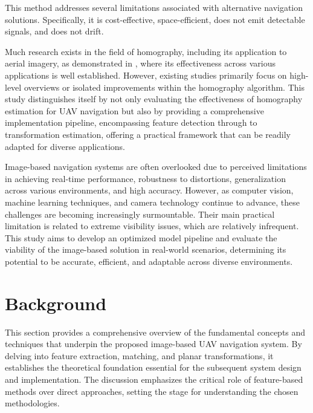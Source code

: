 This method addresses several limitations associated with alternative navigation solutions. Specifically, it is cost-effective, space-efficient, does not emit detectable signals, and does not drift. 

Much research exists in the field of homography, including its application to aerial imagery, as demonstrated in \cite{Zhang2024}, where its effectiveness across various applications is well established. However, existing studies primarily focus on high-level overviews or isolated improvements within the homography algorithm. This study distinguishes itself by not only evaluating the effectiveness of homography estimation for UAV navigation but also by providing a comprehensive implementation pipeline, encompassing feature detection through to transformation estimation, offering a practical framework that can be readily adapted for diverse applications.

Image-based navigation systems are often overlooked due to perceived limitations in achieving real-time performance, robustness to distortions, generalization across various environments, and high accuracy. However, as computer vision, machine learning techniques, and camera technology continue to advance, these challenges are becoming increasingly surmountable. Their main practical limitation is related to extreme visibility issues, which are relatively infrequent. This study aims to develop an optimized model pipeline and evaluate the viability of the image-based solution in real-world scenarios, determining its potential to be accurate, efficient, and adaptable across diverse environments.


\section{Background}

This section provides a comprehensive overview of the fundamental concepts and techniques that underpin the proposed image-based UAV navigation system. By delving into feature extraction, matching, and planar transformations, it establishes the theoretical foundation essential for the subsequent system design and implementation. The discussion emphasizes the critical role of feature-based methods over direct approaches, setting the stage for understanding the chosen methodologies.


